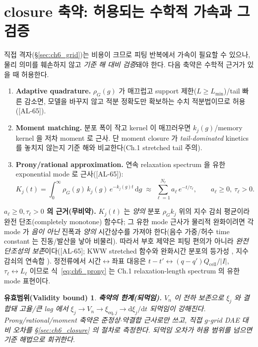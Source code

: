 \documentclass[11pt,a4paper]{article}
\newtheorem*{boundbox}{유효범위(Validity bound)}
\newcommand{\dd}{\mathrm{d}}
\newcommand{\eq}{\mathrm{eq}}
\newcommand{\cell}{\mathrm{cell}}
\newcommand{\AL}[1]{\textsf{[AL-#1]}}
\begin{document}
\section{closure 축약: 허용되는 수학적 가속과 그 검증}\label{sec:ch6_reduction}
직접 격자(\S\ref{sec:ch6_grid})는 비용이 크므로 피팅 반복에서 가속이 필요할 수 있으나, 물리 의미를 훼손하지
않고 \emph{기준 해 대비 검증}돼야 한다. 다음 축약은 수학적 근거가 있을 때 허용한다.
\begin{enumerate}[label=\textbf{(\alph*)},leftmargin=2.4em]
\item \textbf{Adaptive quadrature.} $\rho_G(g)$ 가 매끄럽고 support 제한($L\ge L_{\min}$)/tail 빠른 감소면, 모델을
  바꾸지 않고 적분 정확도만 확보하는 수치 적분법이므로 허용(\AL{65}).
\item \textbf{Moment matching.} 분포 폭이 작고 kernel 이 매끄러우면 $k_j(g)$/memory kernel 을 저차 moment 로 근사.
  단 moment closure 가 \emph{tail-dominated} kinetics 를 놓치지 않는지 기준 해와 비교한다(Ch.1 stretched tail 주의).
\item \textbf{Prony/rational approximation.} 연속 relaxation spectrum 을 유한 exponential mode 로 근사(\AL{65}):
\begin{equation}
K_j(t)=\int_0^\infty\rho_G(g)\,k_j(g)\,e^{-k_j(g)t}\,\dd g\;\approx\;\sum_{\ell=1}^{N_r}a_\ell\,e^{-t/\tau_\ell},
\qquad a_\ell\ge0,\ \tau_\ell>0.
\label{eq:ch6_prony}
\end{equation}
\end{enumerate}
\textbf{$a_\ell\ge0,\tau_\ell>0$ 의 근거(무비약).} $K_j(t)$ 는 \emph{양의} 분포 $\rho_G k_j$ 위의 지수 감쇠 평균이라
완전 단조(completely monotone) 함수다; 그 유한 mode 근사가 물리적 완화이려면 각 mode 가 \emph{음이 아닌} 진폭과
\emph{양의} 시간상수를 가져야 한다(음수 가중/허수 time constant 는 진동/발산을 낳아 비물리). 따라서 부호 제약은
피팅 편의가 아니라 \emph{완전 단조성의 보존}이다(\AL{65}; KWW stretched 함수와 완화시간 분포의 등가성
\cite{lindsey1980}, 지수 감쇠의 연속합 \cite{johnston2006}). 정전류에서 시간$\leftrightarrow$좌표 대응은
$t-t'\leftrightarrow(q-q')Q_\cell/|I|$, $\tau_\ell\leftrightarrow L_\ell$ 이므로 식~\eqref{eq:ch6_prony} 는 Ch.1
relaxation-length spectrum 의 유한 mode 표현이다.
\begin{boundbox}
\textbf{축약의 한계(되먹임).} $V_n$ 이 전하 보존으로 $\xi_j$ 와 결합돼 고율/큰 lag 에서 $\xi_j\to V_n\to\xi_{\eq,j}
\to\dd\xi_j/\dd t$ 되먹임이 강해진다. Prony/rational/moment 축약은 \emph{준정상$\cdot$약결합} 근사로만 쓰고, 직접
$g$-grid DAE 대비 오차를 \S\ref{sec:ch6_closure} 의 절차로 측정한다. 되먹임 오차가 허용 범위를 넘으면 기준
해법으로 회귀한다.
\end{boundbox}
\end{document}
